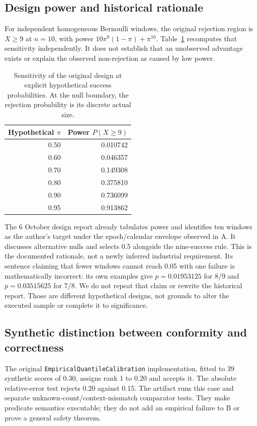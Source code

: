 \documentclass[11pt,a4paper]{article}
\begin{document}
\subsection{Design power and historical rationale}
For independent homogeneous Bernoulli windows, the original rejection region is $X\geq9$ at $n=10$, with power $10\pi^9(1-\pi)+\pi^{10}$. Table~\ref{tab:power} recomputes that sensitivity independently. It does not establish that an unobserved advantage exists or explain the observed non-rejection as caused by low power.
\begin{table}[htbp]\centering\small
\begin{tabular}{rr}\toprule
Hypothetical $\pi$ & Power $P(X\geq9)$\\\midrule
0.50 & 0.010742\\
0.60 & 0.046357\\
0.70 & 0.149308\\
0.80 & 0.375810\\
0.90 & 0.736099\\
0.95 & 0.913862\\
\bottomrule
\end{tabular}
{}
\caption{Sensitivity of the original design at explicit hypothetical success probabilities. At the null boundary, the rejection probability is its discrete actual size.}\label{tab:power}
\end{table}
The 6 October design report already tabulates power and identifies ten windows as the author's target under the epoch/calendar envelope observed in A. It discusses alternative nulls and selects 0.5 alongside the nine-success rule. This is the documented rationale, not a newly inferred industrial requirement. Its sentence claiming that fewer windows cannot reach 0.05 with one failure is mathematically incorrect: its own examples give $p=0.01953125$ for 8/9 and $p=0.03515625$ for 7/8. We do not repeat that claim or rewrite the historical report. Those are different hypothetical designs, not grounds to alter the executed sample or complete it to significance.

\subsection{Synthetic distinction between conformity and correctness}
The original \texttt{EmpiricalQuantileCalibration} implementation, fitted to 39 synthetic scores of 0.30, assigns rank 1 to 0.20 and accepts it. The absolute relative-error test rejects 0.20 against 0.15. The artifact runs this case and separate unknown-count/context-mismatch comparator tests. They make predicate semantics executable; they do not add an empirical failure to B or prove a general safety theorem.
\end{document}
